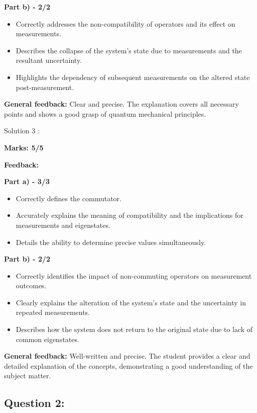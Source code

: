 \documentclass[a4paper,11pt]{article}
\begin{document}
\textbf{Part b) - 2/2}

\begin{itemize}
    \item Correctly addresses the non-compatibility of operators and its effect on measurements.
    \item Describes the collapse of the system's state due to measurements and the resultant uncertainty.
    \item Highlights the dependency of subsequent measurements on the altered state post-measurement.
\end{itemize}

\textbf{General feedback:}
Clear and precise. The explanation covers all necessary points and shows a good grasp of quantum mechanical principles.


Solution 3 :

\textbf{Marks: 5/5}

\textbf{Feedback:}

\textbf{Part a) - 3/3}

\begin{itemize}
    \item Correctly defines the commutator.
    \item Accurately explains the meaning of compatibility and the implications for measurements and eigenstates.
    \item Details the ability to determine precise values simultaneously.
\end{itemize}

\textbf{Part b) - 2/2}

\begin{itemize}
    \item Correctly identifies the impact of non-commuting operators on measurement outcomes.
    \item Clearly explains the alteration of the system's state and the uncertainty in repeated measurements.
    \item Describes how the system does not return to the original state due to lack of common eigenstates.
\end{itemize}

\textbf{General feedback:}
Well-written and precise. The student provides a clear and detailed explanation of the concepts, demonstrating a good understanding of the subject matter.



\subsection*{Question 2:}
\end{document}
